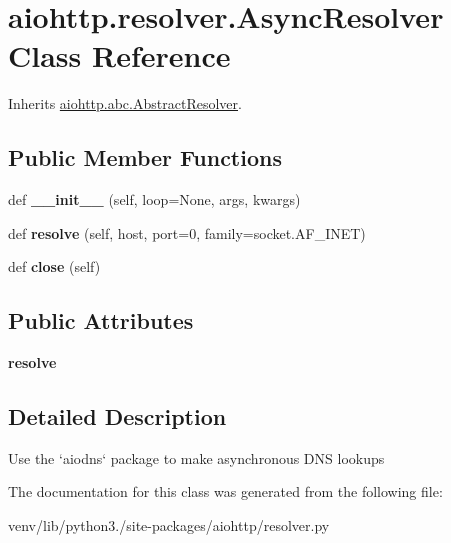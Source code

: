 \hypertarget{classaiohttp_1_1resolver_1_1_async_resolver}{}\section{aiohttp.\+resolver.\+Async\+Resolver Class Reference}
\label{classaiohttp_1_1resolver_1_1_async_resolver}


Inherits \hyperlink{classaiohttp_1_1abc_1_1_abstract_resolver}{aiohttp.\+abc.\+Abstract\+Resolver}.

\subsection*{Public Member Functions}
\begin{DoxyCompactItemize}
\item 
\mbox{\label{classaiohttp_1_1resolver_1_1_async_resolver_a0fa172b8f6dac10e1ee3ae601dd1a395}} 
def {\bfseries \+\_\+\+\_\+init\+\_\+\+\_\+} (self, loop=None, args, kwargs)
\item 
\mbox{\label{classaiohttp_1_1resolver_1_1_async_resolver_aaa85bddff707413dc79bd11c36caa6b2}} 
def {\bfseries resolve} (self, host, port=0, family=socket.\+A\+F\+\_\+\+I\+N\+ET)
\item 
\mbox{\label{classaiohttp_1_1resolver_1_1_async_resolver_afd4803ab70b16d5a6e80ccf1f9fa2e66}} 
def {\bfseries close} (self)
\end{DoxyCompactItemize}
\subsection*{Public Attributes}
\begin{DoxyCompactItemize}
\item 
\mbox{\label{classaiohttp_1_1resolver_1_1_async_resolver_a718d40bd7399c6377dc6a93e94782f2b}} 
{\bfseries resolve}
\end{DoxyCompactItemize}


\subsection{Detailed Description}
\begin{DoxyVerb}Use the `aiodns` package to make asynchronous DNS lookups\end{DoxyVerb}
 

The documentation for this class was generated from the following file\+:\begin{DoxyCompactItemize}
\item 
venv/lib/python3./site-\/packages/aiohttp/resolver.\+py\end{DoxyCompactItemize}
